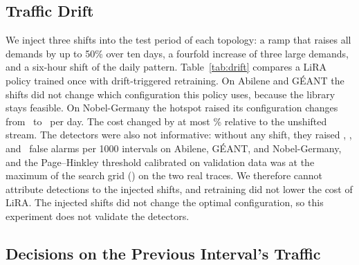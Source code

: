 \documentclass[journal]{IEEEtran}
\begin{document}
\subsection{Traffic Drift}\label{sec:res-drift}

We inject three shifts into the test period of each topology: a ramp that raises all demands by up to 50\% over ten days, a fourfold increase of three large demands, and a six-hour shift of the daily pattern. Table~\ref{tab:drift} compares a LiRA policy trained once with drift-triggered retraining. On Abilene and G\'{E}ANT the shifts did not change which configuration this policy uses, because the library stays feasible. On Nobel-Germany the hotspot raised its configuration changes from \driftNobSwNone\ to \driftNobSwHot\ per day. The cost changed by at most \driftMaxCostPct\% relative to the unshifted stream. The detectors were also not informative: without any shift, they raised \driftFaAbi, \driftFaGea, and \driftFaNob\ false alarms per 1000 intervals on Abilene, G\'{E}ANT, and Nobel-Germany, and the Page--Hinkley threshold calibrated on validation data was at the maximum of the search grid (\driftThrAbi) on the two real traces. We therefore cannot attribute detections to the injected shifts, and retraining did not lower the cost of LiRA. The injected shifts did not change the optimal configuration, so this experiment does not validate the detectors.

\begin{table}[t]
\centering
\caption{Injected Traffic Shifts: Post-Shift Cost $J$ of LiRA Trained Once (``Once'') and with Drift-Triggered Retraining (``Retrained''). FA/1k Is the Number of False Alarms per 1000 Intervals on the Stream Without a Shift}
\label{tab:drift}
\footnotesize
\setlength{\tabcolsep}{3pt}

\end{table}

\subsection{Decisions on the Previous Interval's Traffic}\label{sec:res-stale}
\end{document}
